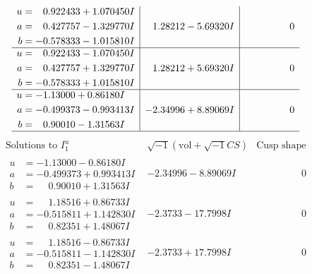 \documentclass[1p]{elsarticle_modified}
\theoremstyle{definition}
\newcommand{\I}{\sqrt{-1}}
\begin{document}
$$\begin{array}{c|c|c}
\begin{aligned}
u &= \phantom{-}0.922433 + 1.070450 I \\
a &= \phantom{-}0.427757 - 1.329770 I \\
b &= -0.578333 - 1.015810 I\end{aligned}
 & \phantom{-}1.28212 - 5.69320 I & \phantom{-0.000000 } 0 \\ \hline\begin{aligned}
u &= \phantom{-}0.922433 - 1.070450 I \\
a &= \phantom{-}0.427757 + 1.329770 I \\
b &= -0.578333 + 1.015810 I\end{aligned}
 & \phantom{-}1.28212 + 5.69320 I & \phantom{-0.000000 } 0 \\ \hline\begin{aligned}
u &= -1.13000 + 0.86180 I \\
a &= -0.499373 - 0.993413 I \\
b &= \phantom{-}0.90010 - 1.31563 I\end{aligned}
 & -2.34996 + 8.89069 I & \phantom{-0.000000 } 0\\
 \hline 
 \end{array}$$\newpage$$\begin{array}{c|c|c}  
\text{Solutions to }I^u_{1}& \I (\text{vol} + \sqrt{-1}CS) & \text{Cusp shape}\\
 \hline 
\begin{aligned}
u &= -1.13000 - 0.86180 I \\
a &= -0.499373 + 0.993413 I \\
b &= \phantom{-}0.90010 + 1.31563 I\end{aligned}
 & -2.34996 - 8.89069 I & \phantom{-0.000000 } 0 \\ \hline\begin{aligned}
u &= \phantom{-}1.18516 + 0.86733 I \\
a &= -0.515811 + 1.142830 I \\
b &= \phantom{-}0.82351 + 1.48067 I\end{aligned}
 & -2.3733 - 17.7998 I & \phantom{-0.000000 } 0 \\ \hline\begin{aligned}
u &= \phantom{-}1.18516 - 0.86733 I \\
a &= -0.515811 - 1.142830 I \\
b &= \phantom{-}0.82351 - 1.48067 I\end{aligned}
 & -2.3733 + 17.7998 I & \phantom{-0.000000 } 0 \\ \hline\begin{aligned}

\end{aligned}
\end{array}$$
\end{document}
